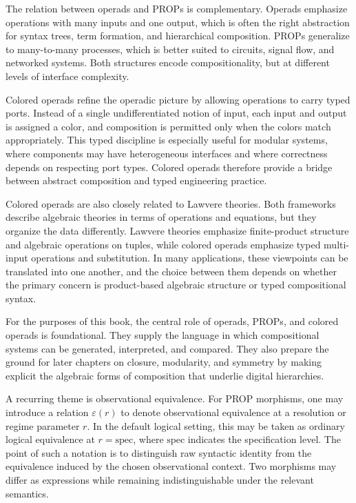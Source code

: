 The relation between operads and PROPs is complementary. Operads emphasize operations with many inputs and one output, which is often the right abstraction for syntax trees, term formation, and hierarchical composition. PROPs generalize to many-to-many processes, which is better suited to circuits, signal flow, and networked systems. Both structures encode compositionality, but at different levels of interface complexity.

Colored operads refine the operadic picture by allowing operations to carry typed ports. Instead of a single undifferentiated notion of input, each input and output is assigned a color, and composition is permitted only when the colors match appropriately. This typed discipline is especially useful for modular systems, where components may have heterogeneous interfaces and where correctness depends on respecting port types. Colored operads therefore provide a bridge between abstract composition and typed engineering practice.

Colored operads are also closely related to Lawvere theories. Both frameworks describe algebraic theories in terms of operations and equations, but they organize the data differently. Lawvere theories emphasize finite-product structure and algebraic operations on tuples, while colored operads emphasize typed multi-input operations and substitution. In many applications, these viewpoints can be translated into one another, and the choice between them depends on whether the primary concern is product-based algebraic structure or typed compositional syntax.

For the purposes of this book, the central role of operads, PROPs, and colored operads is foundational. They supply the language in which compositional systems can be generated, interpreted, and compared. They also prepare the ground for later chapters on closure, modularity, and symmetry by making explicit the algebraic forms of composition that underlie digital hierarchies.

A recurring theme is observational equivalence. For PROP morphisms, one may introduce a relation \(\varepsilon(r)\) to denote observational equivalence at a resolution or regime parameter \(r\). In the default logical setting, this may be taken as ordinary logical equivalence at \(r = \mathrm{spec}\), where \(\mathrm{spec}\) indicates the specification level. The point of such a notation is to distinguish raw syntactic identity from the equivalence induced by the chosen observational context. Two morphisms may differ as expressions while remaining indistinguishable under the relevant semantics.

